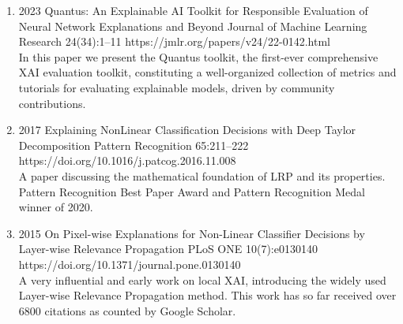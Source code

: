 \begin{enumerate}
            
            \item {}
                        {2023}
                        {Quantus: An Explainable AI Toolkit for Responsible Evaluation of Neural Network Explanations and Beyond}
                        {Journal of Machine Learning Research}
                        {24(34):1--11}
                        {https://jmlr.org/papers/v24/22-0142.html}
                        {\\
                        In this paper we present the Quantus toolkit, the first-ever comprehensive XAI evaluation toolkit, constituting a well-organized collection of metrics and tutorials for evaluating explainable models, driven by community contributions.
                        }
                            
                            
            \item
                                {2017}
                                {Explaining NonLinear Classification Decisions with Deep Taylor Decomposition}
                                {Pattern Recognition}
                                {65:211--222}
                                {https://doi.org/10.1016/j.patcog.2016.11.008}
                                {\\A paper discussing the mathematical foundation of LRP and its properties. Pattern Recognition Best Paper Award and Pattern Recognition Medal winner of 2020.}

            \item
                            {2015}
                            {On Pixel-wise Explanations for Non-Linear Classifier Decisions by Layer-wise Relevance Propagation}
                            {PLoS ONE}
                            {10(7):e0130140}
                            {https://doi.org/10.1371/journal.pone.0130140}
                            {\\A very influential and early work on local XAI, introducing the widely used Layer-wise Relevance Propagation method. This work has so far received over 6800 citations as counted by Google Scholar.}
        
        \end{enumerate}
    
